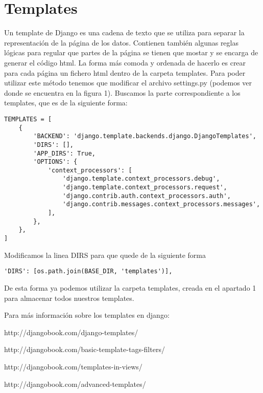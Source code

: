 \section{Templates}

Un template de Django es una cadena de texto que se utiliza para separar la representación
de la página de los datos. Contienen también algunas reglas lógicas para regular
que partes de la página se tienen que mostar y se encarga de generar el código html. La
forma más comoda y ordenada de hacerlo es crear para cada página un fichero html dentro
de la carpeta templates. Para poder utilizar este método tenemos que modificar el archivo
settings.py (podemos ver donde se encuentra en la figura 1). Buscamos la parte
correspondiente a los templates, que es de la siguiente forma:


\lstset{
  language=Python,
}
\begin{lstlisting}
TEMPLATES = [
    {
        'BACKEND': 'django.template.backends.django.DjangoTemplates',
        'DIRS': [],
        'APP_DIRS': True,
        'OPTIONS': {
            'context_processors': [
                'django.template.context_processors.debug',
                'django.template.context_processors.request',
                'django.contrib.auth.context_processors.auth',
                'django.contrib.messages.context_processors.messages',
            ],
        },
    },
]
\end{lstlisting}

Modificamos la linea DIRS para que quede de la siguiente forma

\begin{lstlisting}
'DIRS': [os.path.join(BASE_DIR, 'templates')],
\end{lstlisting}

De esta forma ya podemos utilizar la carpeta templates, creada en el apartado 1 para
almacenar todos nuestros templates.

\hspace{1cm}

Para más información sobre los templates en django:

\hspace{1cm}

http://djangobook.com/django-templates/

http://djangobook.com/basic-template-tags-filters/

http://djangobook.com/templates-in-views/

http://djangobook.com/advanced-templates/

